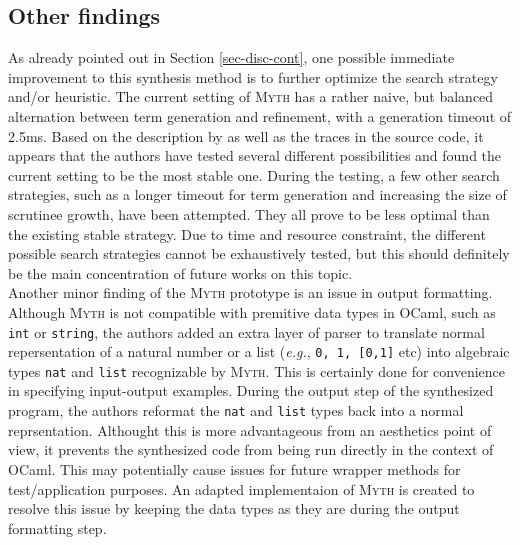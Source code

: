 \documentclass[preprint, 11pt]{sigplanconf}
\begin{document}
\subsection{Other findings}\label{sec-disc-othe}
As already pointed out in Section \ref{sec-disc-cont}, one possible immediate improvement to this synthesis method is to further optimize the search strategy and/or heuristic. The current setting of \textsc{Myth} has a rather naive, but balanced alternation between term generation and refinement, with a generation timeout of 2.5ms. Based on the description by \citet{osera2015type} as well as the traces in the source code, it appears that the authors have tested several different possibilities and found the current setting to be the most stable one. During the testing, a few other search strategies, such as a longer timeout for term generation and increasing the size of scrutinee growth, have been attempted. They all prove to be less optimal than the existing stable strategy. Due to time and resource constraint, the different possible search strategies cannot be exhaustively tested, but this should definitely be the main concentration of future works on this topic.\\

Another minor finding of the \textsc{Myth} prototype is an issue in output formatting. Although \textsc{Myth} is not compatible with premitive data types in OCaml, such as \texttt{int} or \texttt{string}, the authors added an extra layer of parser to translate normal repersentation of a natural number or a list (\emph{e.g.}, \texttt{0, 1, [0,1]} etc) into algebraic types \texttt{nat} and \texttt{list} recognizable by \textsc{Myth}. This is certainly done for convenience in specifying input-output examples. During the output step of the synthesized program, the authors reformat the \texttt{nat} and \texttt{list} types back into a normal reprsentation. Althought this is more advantageous from an aesthetics point of view, it prevents the synthesized code from being run directly in the context of OCaml. This may potentially cause issues for future wrapper methods for test/application purposes. An adapted implementaion of \textsc{Myth} is created to resolve this issue by keeping the data types as they are during the output formatting step. \\
\end{document}
